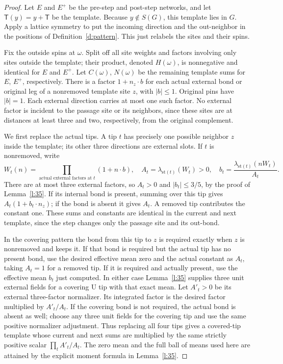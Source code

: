 \begin{proof}
Let \(E\) and \(E^+\) be the pre-step and post-step networks,
and let \(\mathsf T(y)=y+\mathsf T\) be the template.
Because \(y\notin S(G)\), this template lies in \(G\).
Apply a lattice symmetry to put the incoming direction and the
out-neighbor in the positions of Definition~\ref{d:pattern}.
This just relabels the sites and their spins.

Fix the outside spins at \(\omega\). Split off all site weights
and factors involving only sites outside the template; their
product, denoted \(H(\omega)\), is nonnegative and identical
for \(E\) and \(E^+\). Let \(C(\omega)\), \(N(\omega)\) be the
remaining template sums for \(E\), \(E^+\), respectively.
There is a factor \(1+n_z\cdot b\) for each actual external
bond or original leg of a nonremoved template site \(z\), with
\(|b|\le1\). Original pins have \(|b|=1\).
Each external direction carries at most one such factor.
No external factor is incident to the passage site or its
neighbors, since these sites are at distances at least three
and two, respectively, from the original complement.

We first replace the actual tips. A tip \(t\) has precisely one
possible neighbor \(z\) inside the template; its other three
directions are external slots. If \(t\) is nonremoved, write
\[
 W_t(n)=\prod_{\text{actual external factors at }t}(1+n\cdot b),
 \quad A_t=\lambda_{\mathrm{st}(t)}(W_t)>0,\quad
 b_t=\frac{\lambda_{\mathrm{st}(t)}(nW_t)}{A_t}.
\]
There are at most three external factors, so \(A_t>0\) and
\(|b_t|\le3/5\), by the proof of Lemma~\ref{l:35}.
If its internal bond is present, summing over this tip gives
\(A_t(1+b_t\cdot n_z)\); if the bond is absent it gives \(A_t\).
A removed tip contributes the constant one.
These sums and constants are identical in the current and next
template, since the step changes only the passage site and its
out-bond.

In the covering pattern the bond from this tip to \(z\) is
required exactly when \(z\) is nonremoved and keeps it.
If that bond is required but the actual tip has no present bond,
use the desired effective mean zero and the actual constant
as \(A_t\), taking \(A_t=1\) for a removed tip.
If it is required and actually present, use the effective mean
\(b_t\) just computed. In either case Lemma~\ref{l:35}
supplies three unit external fields for a covering
\(\mathrm U\) tip with that exact mean. Let \(A'_t>0\) be
its external three-factor normalizer. Its integrated factor
is the desired factor multiplied by \(A'_t/A_t\).
If the covering bond is not required, the actual bond is
absent as well; choose any three unit fields for the covering
tip and use the same positive normalizer adjustment.
Thus replacing all four tips gives a covered-tip template whose
current and next sums are multiplied by the same strictly
positive scalar \(\prod_t A'_t/A_t\).
The zero mean and the full ball of means used here are attained
by the explicit moment formula in Lemma~\ref{l:35}.


\end{proof}
